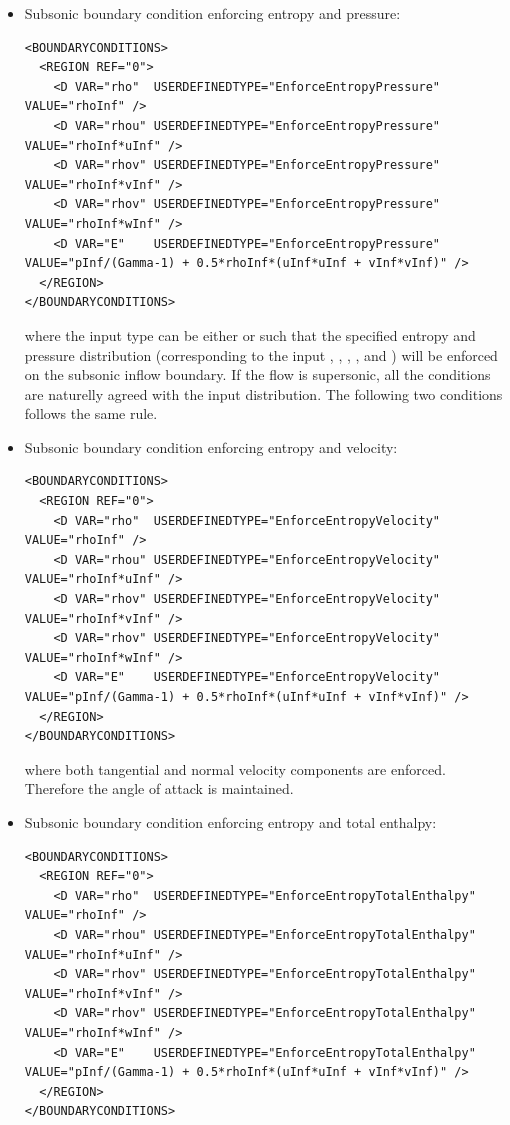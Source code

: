 \begin{itemize}
\item Subsonic boundary condition enforcing entropy and pressure:
\begin{lstlisting}[style=XmlStyle]
<BOUNDARYCONDITIONS>
  <REGION REF="0">
    <D VAR="rho"  USERDEFINEDTYPE="EnforceEntropyPressure" VALUE="rhoInf" />
    <D VAR="rhou" USERDEFINEDTYPE="EnforceEntropyPressure" VALUE="rhoInf*uInf" />
    <D VAR="rhov" USERDEFINEDTYPE="EnforceEntropyPressure" VALUE="rhoInf*vInf" />
    <D VAR="rhov" USERDEFINEDTYPE="EnforceEntropyPressure" VALUE="rhoInf*wInf" />
    <D VAR="E"    USERDEFINEDTYPE="EnforceEntropyPressure" VALUE="pInf/(Gamma-1) + 0.5*rhoInf*(uInf*uInf + vInf*vInf)" />
  </REGION>
</BOUNDARYCONDITIONS>
\end{lstlisting}
where the input type can be either  or  such that the specified entropy and pressure distribution
(corresponding to the input , , , , and )
will be enforced on the subsonic inflow boundary. 
If the flow is supersonic, all the conditions are naturelly agreed with the input distribution.
The following two conditions follows the same rule.

\item Subsonic boundary condition enforcing entropy and velocity:
\begin{lstlisting}[style=XmlStyle]
<BOUNDARYCONDITIONS>
  <REGION REF="0">
    <D VAR="rho"  USERDEFINEDTYPE="EnforceEntropyVelocity" VALUE="rhoInf" />
    <D VAR="rhou" USERDEFINEDTYPE="EnforceEntropyVelocity" VALUE="rhoInf*uInf" />
    <D VAR="rhov" USERDEFINEDTYPE="EnforceEntropyVelocity" VALUE="rhoInf*vInf" />
    <D VAR="rhov" USERDEFINEDTYPE="EnforceEntropyVelocity" VALUE="rhoInf*wInf" />
    <D VAR="E"    USERDEFINEDTYPE="EnforceEntropyVelocity" VALUE="pInf/(Gamma-1) + 0.5*rhoInf*(uInf*uInf + vInf*vInf)" />
  </REGION>
</BOUNDARYCONDITIONS>
\end{lstlisting}
where both tangential and normal velocity components are enforced. Therefore the angle of attack is maintained.

\item Subsonic boundary condition enforcing entropy and total enthalpy:
\begin{lstlisting}[style=XmlStyle]
<BOUNDARYCONDITIONS>
  <REGION REF="0">
    <D VAR="rho"  USERDEFINEDTYPE="EnforceEntropyTotalEnthalpy" VALUE="rhoInf" />
    <D VAR="rhou" USERDEFINEDTYPE="EnforceEntropyTotalEnthalpy" VALUE="rhoInf*uInf" />
    <D VAR="rhov" USERDEFINEDTYPE="EnforceEntropyTotalEnthalpy" VALUE="rhoInf*vInf" />
    <D VAR="rhov" USERDEFINEDTYPE="EnforceEntropyTotalEnthalpy" VALUE="rhoInf*wInf" />
    <D VAR="E"    USERDEFINEDTYPE="EnforceEntropyTotalEnthalpy" VALUE="pInf/(Gamma-1) + 0.5*rhoInf*(uInf*uInf + vInf*vInf)" />
  </REGION>
</BOUNDARYCONDITIONS>
\end{lstlisting}




\end{itemize}

